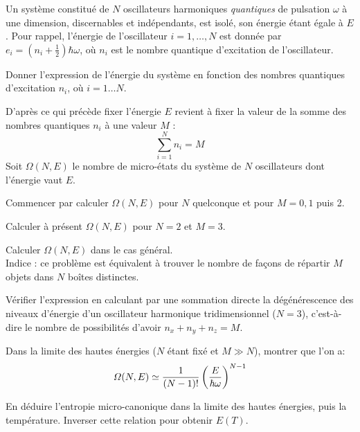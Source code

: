 Un système constitué de $N$ oscillateurs harmoniques {\it quantiques} de pulsation $\omega$ à une dimension, discernables et indépendants, est isolé, son énergie étant égale à $E$. Pour rappel, l'énergie de l'oscillateur $i=1,\dots,N$ est donnée par $e_i=(n_i+\frac{1}{2})\hbar \omega$, où $n_i$ est le nombre quantique d'excitation de l'oscillateur.

\question
Donner l'expression de l'énergie du système en fonction des nombres quantiques d'excitation $n_i$, où $i=1\dots N$.

\medskip
D'après ce qui précède fixer l'énergie $E$ revient à fixer la valeur de la somme des nombres quantiques $n_i$ à une valeur
$M$ :
$$
\sum_{i=1}^N n_i=M
$$
Soit $\varOmega(N,E)$ le nombre de micro-états du système de $N$ oscillateurs dont l'énergie vaut $E$.
 
\question
Commencer par calculer $\varOmega(N,E)$ pour $N$ quelconque et pour $M=0,1$ puis 2.

\question
Calculer à présent $\varOmega(N,E)$ pour $N=2$ et $M=3$.
	
\question
Calculer $\varOmega(N,E)$ dans le cas général.\\
Indice : ce problème est équivalent à trouver le nombre de façons de répartir $M$ objets dans $N$ boîtes distinctes.

\question
Vérifier l'expression en calculant par une sommation directe la dégénérescence des niveaux d'énergie d'un oscillateur harmonique tridimensionnel ($N=3$), c'est-à-dire le nombre de possibilités d'avoir $n_x+n_y+n_z=M$.

\question
Dans la limite des hautes énergies ($N$ étant fixé et $M \gg N$), montrer que l'on a:
$$
\varOmega(N,E)\simeq {1\over (N-1)!}\left({E\over \hbar  \omega}\right)^{N-1}
$$

\question
En déduire l'entropie micro-canonique dans la limite des hautes énergies, puis la température. Inverser cette relation pour obtenir $E(T)$.
